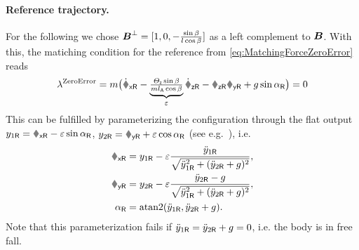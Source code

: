 \paragraph{Reference trajectory.}
For the following we chose $\boldsymbol{B}^\bot = [1, 0, -\tfrac{\sin\beta}{l \cos\beta}]$ as a left complement to $\boldsymbol{B}$.
With this, the matiching condition for the reference from \eqref{eq:MatchingForceZeroError} reads
\begin{align}
 \lambda^{\text{ZeroError}} = \m \big(\vRxd - \underbrace{\tfrac{\Jz \sin\beta}{\m \ArmRadius \cos\beta}}_{\eps} \wRzd - \wRz \vRy + \gravityAccConst \sin\tiltAngleR \big) = 0
\end{align}
This can be fulfilled by parameterizing the configuration through the flat output $y_{1\idxRef} = \rRx - \eps \sin\tiltAngleR$, $y_{2\idxRef} = \rRy + \eps \cos\tiltAngleR$ (see e.g.\ \cite{Fliess:LieBacklund}), i.e.
\begin{align}
 \rxR &= y_{1\idxRef} - \eps \frac{\ddot{y}_{1\idxRef}}{\sqrt{\ddot{y}_{1\idxRef}^2 + (\ddot{y}_{2\idxRef}+\gravityAccConst)^2}},
\\
 \ryR &= y_{2\idxRef} - \eps \frac{\ddot{y}_{2\idxRef}-\gravityAccConst}{\sqrt{\ddot{y}_{1\idxRef}^2 + (\ddot{y}_{2\idxRef}+\gravityAccConst)^2}},
\\
 \tiltAngle_{\idxRef} &= \atanTwo(\ddot{y}_{1\idxRef}, \ddot{y}_{2\idxRef}+\gravityAccConst).
\end{align}
Note that this parameterization fails if $\ddot{y}_{1\mathsf{R}} = \ddot{y}_{2\mathsf{R}}+g = 0$, i.e. the body is in free fall.


